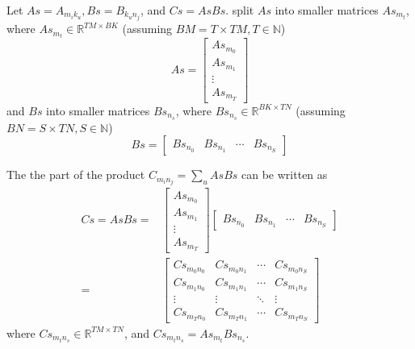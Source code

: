 \documentclass{article}
\begin{document}
Let $As=A_{m_ik_u}, Bs=B_{k_un_j}$, and $Cs=AsBs$.
split $As$ into smaller matrices $As_{m_t}$,
where $As_{m_t} \in \mathbb{R}^{TM\times BK}$
(assuming $BM=T\times TM, T\in \mathbb{N}$)
\begin{equation}
    As=
    \begin{bmatrix}
        As_{m_0} \\
        As_{m_1} \\
        \vdots   \\
        As_{m_{T}}
    \end{bmatrix}
\end{equation}
and $Bs$ into smaller matrices $Bs_{n_s}$,
where $Bs_{n_s} \in \mathbb{R}^{BK\times TN}$
(assuming $BN=S\times TN, S\in \mathbb{N}$)
\begin{equation}
    Bs=\begin{bmatrix}
        Bs_{n_0} & Bs_{n_1} & \cdots & Bs_{n_{S}}
    \end{bmatrix}
\end{equation}

The the part of the product $C_{m_in_j}=\sum_{u}AsBs$ can be written as
\begin{equation}
    \begin{aligned}
        Cs=AsBs= &
        \begin{bmatrix}
            As_{m_0} \\
            As_{m_1} \\
            \vdots   \\
            As_{m_{T}}
        \end{bmatrix}
        \begin{bmatrix}
            Bs_{n_0} & Bs_{n_1} & \cdots & Bs_{n_{S}}
        \end{bmatrix}
        \\
        =        &
        \begin{bmatrix}
            Cs_{m_0n_0}   & Cs_{m_0n_1}   & \cdots & Cs_{m_0n_{S}}   \\
            Cs_{m_1n_0}   & Cs_{m_1n_1}   & \cdots & Cs_{m_1n_{S}}   \\
            \vdots        & \vdots        & \ddots & \vdots          \\
            Cs_{m_{T}n_0} & Cs_{m_{T}n_1} & \cdots & Cs_{m_{T}n_{S}}
        \end{bmatrix}
    \end{aligned}
    \label{Cs=AsBs}
\end{equation}
where $Cs_{m_tn_s} \in \mathbb{R}^{TM\times TN}$, and $Cs_{m_tn_s}=As_{m_t}Bs_{n_s}$.
\end{document}
